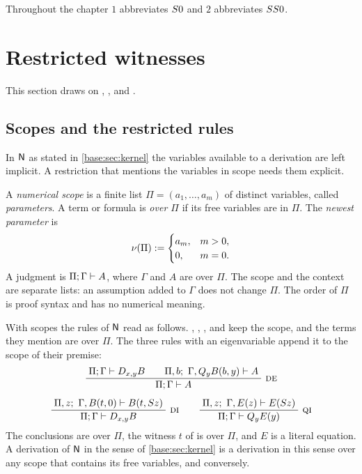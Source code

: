 Throughout the chapter $1$ abbreviates $S 0$ and $2$ abbreviates
$SS 0$.

\section{Restricted witnesses}
\label{wit:sec:restricted}

This section draws on , ,
 and .

\subsection{Scopes and the restricted rules}

In $\mathsf{N}$ as stated in \cref{base:sec:kernel} the variables available to a
derivation are left implicit.  A restriction that mentions the variables in
scope needs them explicit.

\begin{definition}[Scopes]
\label{wit:def:scope}
A \emph{numerical scope} is a finite list $\Pi=(a_1,\dots,a_m)$ of distinct
variables, called \emph{parameters}.  A term or formula is \emph{over $\Pi$}
if its free variables are in $\Pi$.  The \emph{newest parameter} is
\[
 \nu(\Pi)\mathrel{:=}
 \begin{cases}
  a_m, & m>0,\\
  0, & m=0.
 \end{cases}
\]
A judgment is $\Pi;\Gamma\vdash A$, where $\Gamma$ and $A$ are over $\Pi$.
The scope and the context are separate lists: an assumption added to $\Gamma$
does not change $\Pi$.  The order of $\Pi$ is proof syntax and has no
numerical meaning.
\end{definition}

With scopes the rules of $\mathsf{N}$ read as follows.  ,
, ,  and  keep the scope,
and the terms they mention are over $\Pi$.  The three rules with an
eigenvariable append it to the scope of their premise:
\begin{gather*}
 \infrule{\Pi;\Gamma\proves\D{x}{y}B\qquad
          \Pi,b;\ \Gamma,\Q{y}B(b,y)\proves A}
         {\Pi;\Gamma\proves A}\ \rulename{DE}
 \\[1.2ex]
 \infrule{\Pi,z;\ \Gamma,B(t,0)\proves B(t,\Suc z)}
         {\Pi;\Gamma\proves\D{x}{y}B}\ \rulename{DI}
 \qquad
 \infrule{\Pi,z;\ \Gamma,E(z)\proves E(\Suc z)}
         {\Pi;\Gamma\proves\Q{y}E(y)}\ \rulename{QI}
\end{gather*}
The conclusions are over $\Pi$, the witness $t$ of  is over
$\Pi$, and $E$ is a literal equation.  A derivation of $\mathsf{N}$ in the sense of
\cref{base:sec:kernel} is a derivation in this sense over any scope that
contains its free variables, and conversely.

